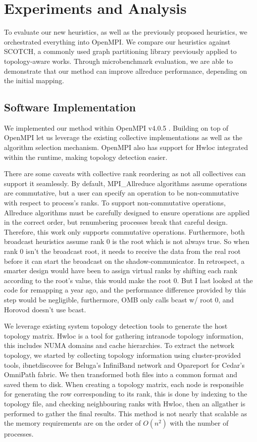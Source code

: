 \section{Experiments and Analysis}
To evaluate our new heuristics, as well as the previously proposed heuristics, we orchestrated everything into OpenMPI.
We compare our heuristics against SCOTCH, a commonly used graph partitioning library previously applied to topology-aware works.
Through microbenchmark evaluation, we are able to demonstrate that our method can improve allreduce performance, depending on the initial mapping.

\subsection{Software Implementation}
We implemented our method within OpenMPI v4.0.5 \cite{gabriel2004OpenMPI}.
Building on top of OpenMPI let us leverage the existing collective implementations as well as the algorithm selection mechanism.
OpenMPI also has support for Hwloc integrated within the runtime, making topology detection easier.

There are some caveats with collective rank reordering as not all collectives can support it seamlessly.
By default, MPI\_Allreduce algorithms assume operations are commutative, but a user can specify an operation to be non-commutative with respect to process's ranks. 
To support non-commutative operations, Allreduce algorithms must be carefully designed to ensure operations are applied in the correct order, but renumbering processes break that careful design.
Therefore, this work only supports commutative operations.
Furthermore, both broadcast heuristics assume rank 0 is the root which is not always true. 
So when rank 0 isn't the broadcast root, it needs to receive the data from the real root before it can start the broadcast on the shadow-communicator.
In retrospect, a smarter design would have been to assign virtual ranks by shifting each rank according to the root's value, this would make the root 0.
But I last looked at the code for remapping a year ago, and the performance difference provided by this step would be negligible, furthermore, OMB only calls bcast w/ root 0, and Horovod doesn't use bcast.

We leverage existing system topology detection tools to generate the host topology matrix.
Hwloc \cite{Broquedis2010hwloc} is a tool for gathering intranode topology information, this includes NUMA domains and cache hierarchies.
To extract the network topology, we started by collecting topology information using cluster-provided tools, ibnetdiscovee for Beluga's InfiniBand network and Opareport for Cedar's OmniPath fabric.
We then transformed both files into a common format and saved them to disk.
When creating a topology matrix, each node is responsible for generating the row corresponding to its rank, this is done by indexing to the topology file, and checking neighbouring ranks with Hwloc, then an allgather is performed to gather the final results.
This method is not nearly that scalable as the memory requirements are on the order of $O(n^2)$ with the number of processes.

